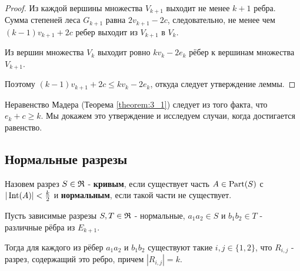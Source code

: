 \begin{proof}
	Из каждой вершины множества $V_{k + 1}$ выходит не менее  $k + 1$ ребра.
Сумма степеней леса  $G_{k + 1}$ равна  $2v_{k + 1} - 2c$, следовательно, не менее чем  $(k - 1) v_{k + 1} + 2c$ ребер выходит из $V_{k +1}$ в  $V_k$.

Из вершин множества $V_k$ выходит ровно  $k v_k - 2 e_k$ рёбер к вершинам множества  $V_{k + 1}$.

Поэтому  $(k - 1) v_{k + 1} + 2c \leqslant k v_k - 2 e_k$, откуда следует утверждение леммы.

\end{proof}

Неравенство Мадера (Теорема \ref{theorem:3_1}) следует из того факта, что $e_k + c \geqslant k$.
Мы докажем это утверждение и исследуем случаи, когда достигается равенство.

\subsection{Нормальные разрезы}

\begin{df}
	Назовем разрез $S \in \mathfrak{R}$ - \textbf{кривым}, если существует часть  $A \in \operatorname{Part}(S)$ с  $|\operatorname{Int}(A)| < \frac k 2$ и  \textbf{нормальным}, если такой части не существует.
\end{df}

\begin{lm}[Лемма 3.4] \label{lemma:3_4}
	Пусть зависимые разрезы $S, T \in \mathfrak{R}$ - нормальные,  $a_1a_2 \in S$ и $b_1 b_2 \in T$ - различные рёбра из $E_{k + 1}$.

	Тогда для каждого из рёбер  $a_1a_2$ и $b_1b_2$ существуют такие $i, j \in \{1, 2\}$, что  $R_{i, j}$ - разрез, содержащий это ребро, причем  $|R_{i, j}| = k$.
\end{lm}

